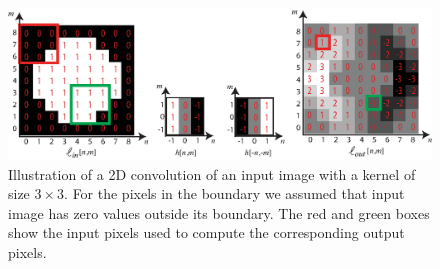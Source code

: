 \begin{figure}[h!]
	\centerline{
		\includegraphics[width=1\linewidth]{figures/linear_image_filtering/circle_conv_example.eps}
	}
	\caption{
		Illustration of a 2D convolution of an input image with a kernel of size $3 \times 3$.
		For the pixels in the boundary we assumed that input image has zero values outside its boundary.
		The red and green boxes show the input pixels used to compute the corresponding output pixels.
	}
	\label{fig:circle_2dconv}
\end{figure}










